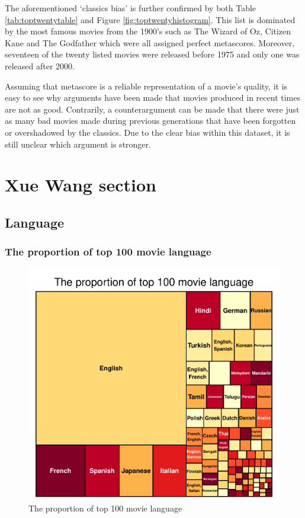 \documentclass[11pt,a4paper,]{article}
\begin{document}
The aforementioned `classics bias' is further confirmed by both Table \ref{tab:toptwentytable} and Figure \ref{fig:toptwentyhistogram}. This list is dominated by the most famous movies from the 1900's such as The Wizard of Oz, Citizen Kane and The Godfather which were all assigned perfect metascores. Moreover, seventeen of the twenty listed movies were released before 1975 and only one was released after 2000.

Assuming that metascore is a reliable representation of a movie's quality, it is easy to see why arguments have been made that movies produced in recent times are not as good. Contrarily, a counterargument can be made that there were just as many bad movies made during previous generations that have been forgotten or overshadowed by the classics. Due to the clear bias within this dataset, it is still unclear which argument is stronger.

\newpage

\hypertarget{xue-wang-section}{%
\section{Xue Wang section}\label{xue-wang-section}}

\hypertarget{language}{%
\subsection{Language}\label{language}}

\hypertarget{the-proportion-of-top-100-movie-language}{%
\subsubsection{The proportion of top 100 movie language}\label{the-proportion-of-top-100-movie-language}}

\begin{figure}
\centering
\includegraphics{Report_files/figure-latex/language-1.pdf}
\caption{\label{fig:language}The proportion of top 100 movie language}
\end{figure}
\end{document}
